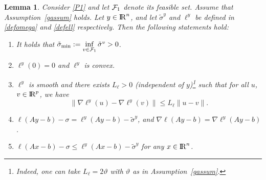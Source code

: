 \documentclass[10pt]{article}
\numberwithin{equation}{section}
\newtheorem{lemma}{Lemma}[section]
\def\R{{\rm I\!R}}
\def\sigmamin{{\rm\tilde{\sigma}_{min}}}
\begin{document}
\begin{lemma}\label{ell+}
 Consider \eqref{P1} and let ${\cal F}_1$ denote its feasible set. Assume that Assumption~\ref{gassum} holds. Let $y\in \R^n$, and let $\tilde \sigma^y$ and $\ell^y$ be defined in \eqref{defomega} and \eqref{defell} respectively. Then the following statements hold:
\begin{enumerate}[{\rm (i)}]
  \item It holds that $\sigmamin:= \inf\limits_{v\in \mathcal{F}_1}\tilde{\sigma}^v > 0$.
  \item $\ell^y(0) = 0$ and $\ell^y$ is convex.
  \item $\ell^y$ is smooth and there exists $L_\ell > 0$ (independent of $y$)\footnote{Indeed, one can take $L_\ell = 2\vartheta$ with $\vartheta$ as in Assumption~\ref{gassum}.} such that for all $u$, $v\in \R^p$, we have
  \begin{equation}\label{Lipineq}
  \|\nabla \ell^y(u) - \nabla \ell^y(v)\| \le L_\ell\|u - v\|.
  \end{equation}
  \item $\ell(Ay - b) - \sigma = \ell^y(Ay - b) - \tilde{\sigma}^y$, and $\nabla\ell(Ay - b) = \nabla\ell^y(Ay - b)$.
  \item $\ell(Ax - b) - \sigma \leq \ell^y(Ax - b) - \tilde{\sigma}^y$ for any $x\in\R^n$.
\end{enumerate}
\end{lemma}
\end{document}
